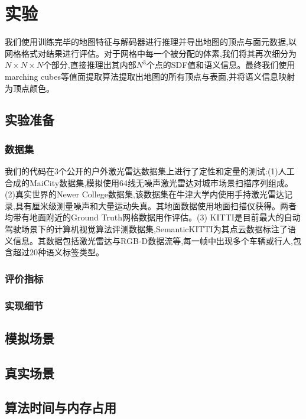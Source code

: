 \section{实验}\label{numerical experiments}
我们使用训练完毕的地图特征与解码器进行推理并导出地图的顶点与面元数据,以网格格式对结果进行评估。对于网格中每一个被分配的体素,我们将其再次细分为$N \times N \times N$个部分,直接推理出其内部$N^3$个点的SDF值和语义信息。最终我们使用marching cubes\cite{marchingcubes}等值面提取算法提取出地图的所有顶点与表面,并将语义信息映射为顶点颜色。
\subsection{实验准备}
\subsubsection{数据集}
我们的代码在3个公开的户外激光雷达数据集上进行了定性和定量的测试:(1)人工合成的MaiCity数据集\cite{maicity},模拟使用64线无噪声激光雷达对城市场景扫描序列组成。(2)真实世界的Newer College数据集\cite{ncd},该数据集在牛津大学内使用手持激光雷达记录,具有厘米级测量噪声和大量运动失真。其地面数据使用地面扫描仪获得。两者均带有地面附近的Ground Truth网格数据用作评估。(3) KITTI\cite{KITTI}是目前最大的自动驾驶场景下的计算机视觉算法评测数据集,SemanticKITTI\cite{SemanticKITTI}为其点云数据标注了语义信息。其数据包括激光雷达与RGB-D数据流等,每一帧中出现多个车辆或行人,包含超过20种语义标签类型。
\subsubsection{评价指标}
\subsubsection{实现细节}
\subsection{模拟场景}
\subsection{真实场景}
\subsection{算法时间与内存占用}

